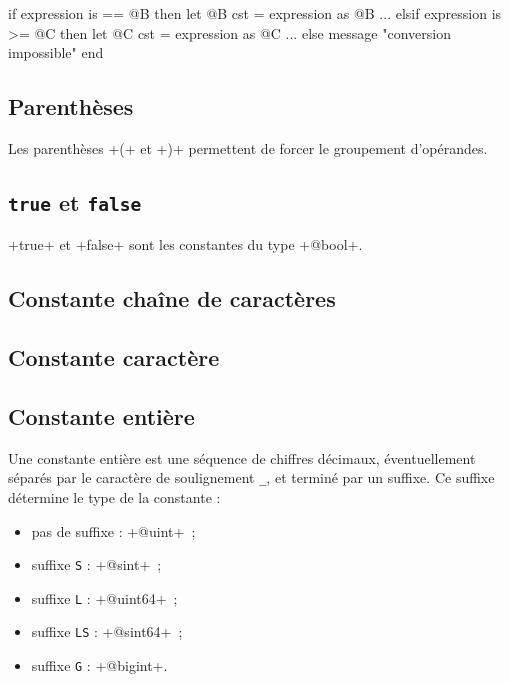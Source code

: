 \begin{galgas3}
if expression is == @B then
  let @B cst = expression as @B
  ...
elsif expression is >= @C then
  let @C cst = expression as @C
  ...
else
  message "conversion impossible"
end
\end{galgas3}





\subsection{Parenthèses}

Les parenthèses \ggst+(+ et \ggst+)+ permettent de forcer le groupement d'opérandes.






\subsection{\texttt{true} et \texttt{false}}

\ggst+true+ et \ggst+false+ sont les constantes du type \ggst+@bool+.

\subsection{Constante chaîne de caractères}

\subsection{Constante caractère}

\subsection{Constante entière}

Une constante entière est une séquence de chiffres décimaux, éventuellement séparés par le caractère de soulignement \texttt{\_}, et terminé par un suffixe. Ce suffixe détermine le type de la constante :
\begin{itemize}
  \item pas de suffixe : \ggst+@uint+~;
  \item suffixe \texttt{S} : \ggst+@sint+~;
  \item suffixe \texttt{L} : \ggst+@uint64+~;
  \item suffixe \texttt{LS} : \ggst+@sint64+~;
  \item suffixe \texttt{G} : \ggst+@bigint+.
\end{itemize}

